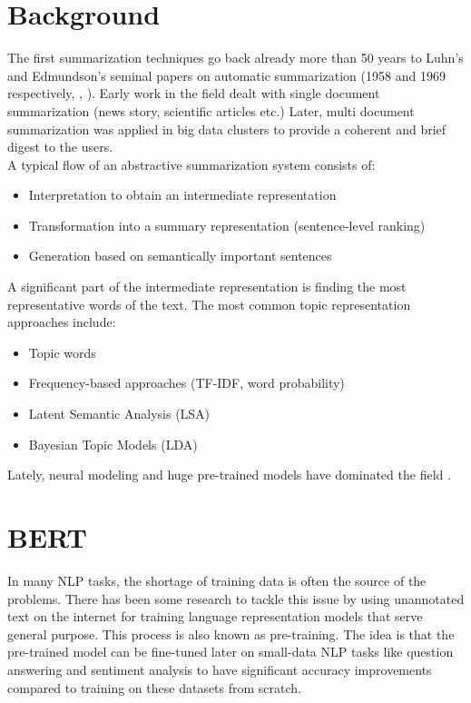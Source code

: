 \documentclass{article}
\begin{document}
\section{Background}
The first summarization techniques go back already more than 50 years to Luhn’s and Edmundson’s seminal papers on automatic summarization (1958 and 1969 respectively, \cite{textmining1958}, \cite{automaticextracting}). Early work in the field dealt with single document summarization (news story, scientific articles etc.) Later, multi document summarization was applied in big data clusters to provide a coherent and brief digest to the users. \\

\noindent
A typical flow of an abstractive summarization system \cite{summarizing} consists of:
\begin{itemize}
	\item Interpretation to obtain an intermediate representation
	\item Transformation into a summary representation (sentence-level ranking)
	\item Generation based on semantically important sentences
\end{itemize}

A significant part of the intermediate representation is finding the most representative words of the text. The most common topic representation approaches \cite{survey} include:
\begin{itemize}
	\item Topic words 
	\item Frequency-based approaches (TF-IDF, word probability)
	\item Latent Semantic Analysis (LSA)
	\item Bayesian Topic Models (LDA)
\end{itemize}

Lately, neural modeling and huge pre-trained models have dominated the field \cite{neuralextractive}.

\section{BERT }
In many NLP tasks, the shortage of training data is often the source of the problems. There has been some research to tackle this issue by using unannotated text on the internet for training language representation models that serve general purpose. This process is also known as pre-training. The idea is that the pre-trained model can be fine-tuned later on small-data NLP tasks like question answering and sentiment analysis to have significant accuracy improvements compared to training on these datasets from scratch. 
\end{document}
